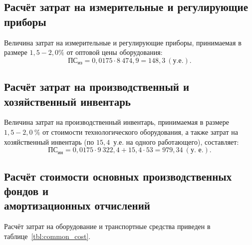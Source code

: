 \subsection{Расчёт затрат на измерительные и регулирующие приборы}

Величина затрат на измерительные и регулирующие приборы,
принимаемая в размере $1{,}5-2{,}0\%$ от
оптовой цены оборудования:
\begin{equation*}
  \text{ПС}_{\text{из}} = 0{,}0175 \cdot 8~474{,}9 = 148{,}3 ~(\text{у.е.}).
\end{equation*}


\subsection{Расчёт затрат на производственный и хозяйственный инвентарь}

Величина затрат на производственный инвентарь,
принимаемая в размере $1{,}5-2{,}0~\%$ от
стоимости технологического оборудования, а также
затрат на хозяйственный инвентарь
(по $15{,}4$~у.е. на одного работающего), составляет:
\begin{equation*}
  \text{ПС}_{\text{ин}} =
  0{,}0175 \cdot 9~322{,}4 + 15{,}4 \cdot 53 = 979{,}34~(\text{у.~е.}).
\end{equation*}

\newpage

\subsection{Расчёт стоимости основных производственных фондов и \\
амортизационных отчислений}

Расчёт затрат на оборудование и транспортные средства
приведен в таблице~\ref{tbl:common_cost}.

